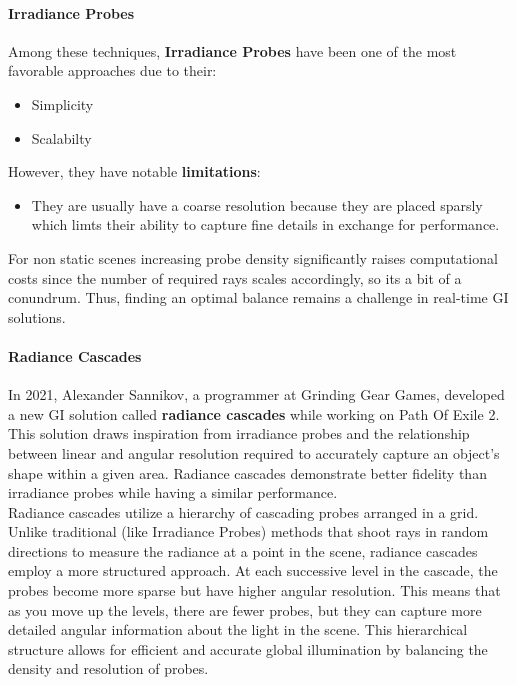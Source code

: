 \documentclass[sigconf, nonacm]{acmart}
\begin{document}
\paragraph{Irradiance Probes} Among these techniques, \textbf{Irradiance Probes}\cite{crytek} have been one of the most favorable approaches due to their:
\begin{itemize}
    \item Simplicity
    \item Scalabilty
\end{itemize}

However, they have notable \textbf{limitations}:
\begin{itemize}
    \item They are usually have a coarse resolution because they are placed sparsly which limts their ability to capture fine details in exchange for performance.
\end{itemize}

For non static scenes increasing probe density significantly raises computational costs since the number of required rays scales accordingly, so its a bit of a conundrum. Thus, finding an optimal balance remains a challenge in real-time GI solutions.\\

\paragraph{Radiance Cascades} In 2021, Alexander Sannikov, a programmer at Grinding Gear Games, developed a new GI solution called \textbf{radiance cascades}\cite{sannikov} while working on Path Of Exile 2. This solution draws inspiration from irradiance probes and the relationship between linear and angular resolution required to accurately capture an object's shape within a given area. Radiance cascades demonstrate better fidelity than irradiance probes while having a similar performance.\\

Radiance cascades utilize a hierarchy of cascading probes arranged in a grid. Unlike traditional (like Irradiance Probes) methods that shoot rays in random directions to measure the radiance at a point in the scene, radiance cascades employ a more structured approach. At each successive level in the cascade, the probes become more sparse but have higher angular resolution. This means that as you move up the levels, there are fewer probes, but they can capture more detailed angular information about the light in the scene. This hierarchical structure allows for efficient and accurate global illumination by balancing the density and resolution of probes.\\ 
\end{document}
